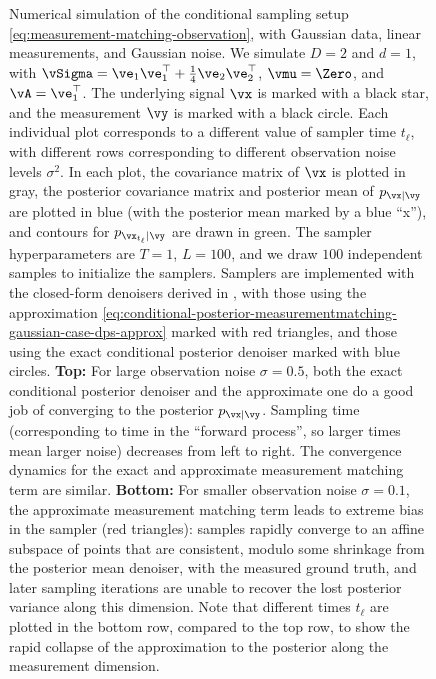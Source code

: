 \documentclass[../../book-main.tex]{subfiles}
\begin{document}
\begin{figure}[tbp]
  \caption{Numerical simulation of the conditional sampling setup
  \eqref{eq:measurement-matching-observation}, with Gaussian data, linear
  measurements, and Gaussian noise. We simulate $D=2$ and $d=1$, with $\vSigma
  = \ve_1 \ve_1^\top + \tfrac{1}{4} \ve_2 \ve_2^\top$, $\vmu = \Zero$, and
  $\vA = \ve_1^\top$. The underlying signal $\vx$ is marked with a black star,
  and the measurement $\vy$ is marked with a black circle.
  Each individual plot corresponds to a different value of sampler time
  $t_{\ell}$, with different rows corresponding to different observation noise
  levels $\sigma^2$.
  In each plot, the covariance matrix of $\vx$ is plotted in gray, the
  posterior covariance matrix and posterior mean of $p_{\vx \mid \vy}$ are
  plotted in blue (with the posterior mean marked by a blue ``x''), and
  contours for $p_{\vx_{t_{\ell}} \mid \vy}$ are drawn in green. The sampler
  hyperparameters are $T=1$, $L=100$, and we draw $100$
  independent samples to initialize the samplers. Samplers are implemented
  with the closed-form denoisers derived in
  , with those using the
  approximation
  \eqref{eq:conditional-posterior-measurementmatching-gaussian-case-dps-approx}
  marked with red triangles, and those using the exact conditional posterior
  denoiser marked with blue circles.
  \textbf{Top:} For large observation noise $\sigma = 0.5$, both the exact
  conditional posterior denoiser and the approximate one do a good job of
  converging to the posterior $p_{\vx \mid \vy}$. Sampling time (corresponding
  to time in the ``forward process'', so larger times mean larger noise)
  decreases from left to right.  The convergence dynamics for the exact and
  approximate measurement matching term are similar. \textbf{Bottom:} For
  smaller observation noise $\sigma = 0.1$, the
  approximate measurement matching term leads to extreme bias in the sampler
  (red triangles): samples rapidly converge to an affine subspace
  of points that are consistent, modulo some shrinkage from the posterior mean
  denoiser, with the measured ground truth, and later sampling iterations are
  unable to recover the lost posterior variance along this dimension. Note
  that different times $t_{\ell}$ are plotted in the bottom row, compared to
  the top row, to show the rapid collapse of the approximation to the
  posterior along the measurement dimension.}
  \label{fig:conditional_sampling_computational_gaussian}
\end{figure}
\end{document}
